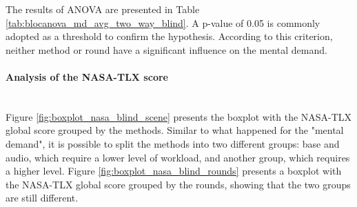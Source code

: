 The results of ANOVA are presented in Table \ref{tab:blocanova_md_avg_two_way_blind}. A p-value of 0.05 is commonly adopted as a threshold to confirm the hypothesis. According to this criterion, neither method or round have a significant influence on the mental demand.



\paragraph*{Analysis of the NASA-TLX score}\mbox{}\\

Figure \ref{fig:boxplot_nasa_blind_scene} presents the boxplot with the NASA-TLX global score grouped by the methods. Similar to what happened for the "mental demand", it is possible to split the methods into two different groups: base and audio, which require a lower level of workload, and another group, which requires a higher level. Figure \ref{fig:boxplot_nasa_blind_rounds} presents a boxplot with the NASA-TLX global score grouped by the rounds, showing that the two groups are still different. 

